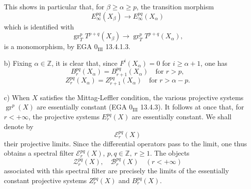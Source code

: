 \documentclass[11pt]{article}
\providecommand{\gr}{\operatorname{gr}}
\providecommand{\gr}{\operatorname{gr}}
\providecommand{\gr}{\operatorname{gr}}
\begin{document}
This shows in particular that, for \(\beta\ge\alpha\ge p\), the transition morphism
\[
E_\infty^{pq}(X_\beta)\longrightarrow E_\infty^{pq}(X_\alpha)
\]
which is identified with
\[
\gr_T^pT^{p+q}(X_\beta)\longrightarrow
\gr_T^pT^{p+q}(X_\alpha),
\]
is a monomorphism, by EGA \(0_{\mathrm{III}}\) 13.4.1.3.

b) Fixing \(\alpha\in\mathbb Z\), it is clear that, since \(F^i(X_\alpha)=0\) for \(i\ge\alpha+1\), one has
\[
B_r^{pq}(X_\alpha)=B_{r+1}^{pq}(X_\alpha)\quad\text{for }r>p,
\]
\[
Z_r^{pq}(X_\alpha)=Z_{r+1}^{pq}(X_\alpha)\quad\text{for }r>\alpha-p.
\]

c) When \(X\) satisfies the Mittag-Leffler condition, the various projective systems \(\gr^p(X)\) are essentially constant (EGA \(0_{\mathrm{III}}\) 13.4.3). It follows at once that, for \(r<+\infty\), the projective systems \(E_r^{pq}(X)\) are essentially constant. We shall denote by
\[
\mathcal E_r^{pq}(X)
\]
their projective limits. Since the differential operators pass to the limit, one thus obtains a spectral filter \(\mathcal E_r^{pq}(X)\), \(p,q\in\mathbb Z,\ r\ge1\). The objects
\[
\mathcal Z_r^{pq}(X),\quad \mathcal B_r^{pq}(X)\quad(r<+\infty)
\]
associated with this spectral filter are precisely the limits of the essentially constant projective systems \(Z_r^{pq}(X)\) and \(B_r^{pq}(X)\).
\end{document}
